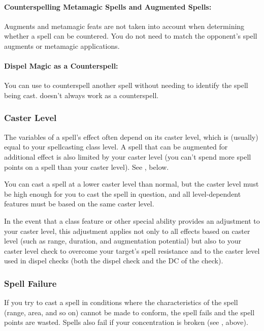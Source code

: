 \documentclass[../VancianToPsionics.tex]{subfiles}
\begin{document}
\paragraph{Counterspelling Metamagic Spells and Augmented Spells:}
Augments and metamagic feats are not taken into account when determining whether a spell can be countered. You do not need to match the opponent's spell augments or metamagic applications.

\paragraph{Dispel Magic as a Counterspell:}
You can use  to counterspell another spell without needing to identify the spell being cast.  doesn't always work as a counterspell.

\subsubsection{Caster Level}
The variables of a spell's effect often depend on its caster level, which is (usually) equal to your spellcasting class level. A spell that can be augmented for additional effect is also limited by your caster level (you can't spend more spell points on a spell than your caster level). See , below.

You can cast a spell at a lower caster level than normal, but the caster level must be high enough for you to cast the spell in question, and all level-dependent features must be based on the same caster level.

In the event that a class feature or other special ability provides an adjustment to your caster level, this adjustment applies not only to all effects based on caster level (such as range, duration, and augmentation potential) but also to your caster level check to overcome your target's spell resistance and to the caster level used in dispel checks (both the dispel check and the DC of the check).

\subsubsection{Spell Failure}
If you try to cast a spell in conditions where the characteristics of the spell (range, area, and so on) cannot be made to conform, the spell fails and the spell points are wasted. Spells also fail if your concentration is broken (see , above).
\end{document}
